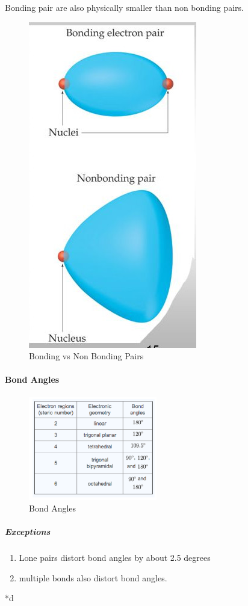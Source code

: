\documentclass[]{article}
\providecommand{\tightlist}{%
  \setlength{\itemsep}{0pt}\setlength{\parskip}{0pt}}
\let\oldparagraph\paragraph
\renewcommand{\paragraph}[1]{\oldparagraph{#1}\mbox{}}
\let\oldsubparagraph\subparagraph
\renewcommand{\subparagraph}[1]{\oldsubparagraph{#1}\mbox{}}
\begin{document}
Bonding pair are also physically smaller than non bonding pairs.

\begin{figure}
\centering
\includegraphics[height=0.50000\textwidth]{Images/BondingVSNonBonding.jpg}
\caption{Bonding vs Non Bonding Pairs}
\end{figure}

\paragraph{Bond Angles}\label{bond-angles}

\begin{figure}
\centering
\includegraphics[width=0.50000\textwidth]{Images/BondAngles.jpg}
\caption{Bond Angles}
\end{figure}

\subparagraph{Exceptions}\label{exceptions-2}

\begin{enumerate}
\def\labelenumi{\arabic{enumi}.}
\tightlist
\item
  Lone pairs distort bond angles by about 2.5 degrees
\item
  multiple bonds also distort bond angles.
\end{enumerate}

*d
\end{document}

